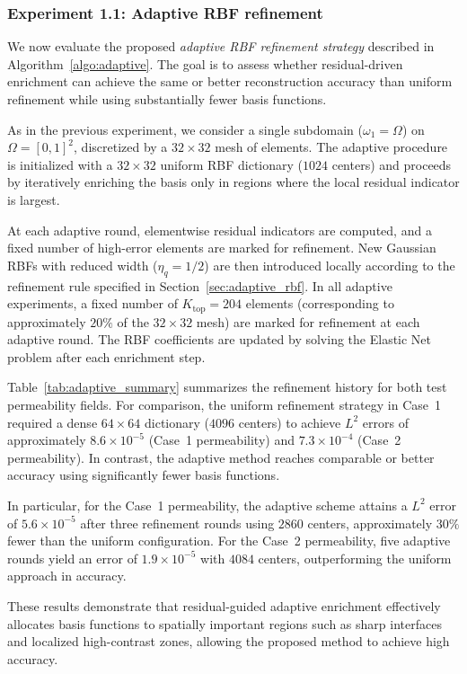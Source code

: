 \documentclass[final,1p,times]{elsarticle}
\theoremstyle{plain}
\theoremstyle{definition}
\theoremstyle{remark}
\begin{document}
\subsubsection{Experiment 1.1: Adaptive RBF refinement}
\label{sec:case2_adaptive}

We now evaluate the proposed \emph{adaptive RBF refinement strategy} described in
Algorithm~\ref{algo:adaptive}. The goal is to assess whether residual-driven
enrichment can achieve the same or better reconstruction accuracy than uniform
refinement while using substantially fewer basis functions.

As in the previous experiment, we consider a single subdomain ($\omega_1=\Omega$) on
$\Omega=[0,1]^2$, discretized by a $32\times32$ mesh of elements. The adaptive
procedure is initialized with a $32\times32$ uniform RBF dictionary
($1024$ centers) and proceeds by iteratively enriching the basis only in regions
where the local residual indicator is largest.

At each adaptive round, elementwise residual indicators are computed, and a fixed number of high-error elements are marked for
refinement. New Gaussian RBFs with reduced width ($\eta_q=1/2$) are then introduced locally
according to the refinement rule specified in
Section~\ref{sec:adaptive_rbf}. In all adaptive experiments, a fixed number of $K_{\mathrm{top}}=204$ elements
(corresponding to approximately $20\%$ of the $32\times32$ mesh) are marked for refinement at each adaptive round. The RBF coefficients are updated by solving the
Elastic Net problem after each enrichment step.

Table~\ref{tab:adaptive_summary} summarizes the refinement history for both test
permeability fields. For comparison, the uniform refinement strategy in Case~1 required a dense
$64\times64$ dictionary ($4096$ centers) to achieve $L^2$ errors of
approximately $8.6\times10^{-5}$ (Case~1 permeability) and
$7.3\times10^{-4}$ (Case~2 permeability). In contrast, the adaptive method reaches
comparable or better accuracy using significantly fewer basis functions.

In particular, for the Case~1 permeability, the adaptive scheme attains a $L^2$ error of $5.6\times10^{-5}$ after three refinement rounds using $2860$ centers{, approximately $30\%$ fewer than} the uniform configuration.
For the Case~2 permeability, five adaptive rounds yield an error of
$1.9\times10^{-5}$ with $4084$ centers, outperforming the uniform approach in accuracy.

These results demonstrate that residual-guided adaptive enrichment effectively
allocates basis functions to spatially important regions such as sharp
interfaces and localized high-contrast zones, allowing the proposed method to
achieve high accuracy.
\end{document}
